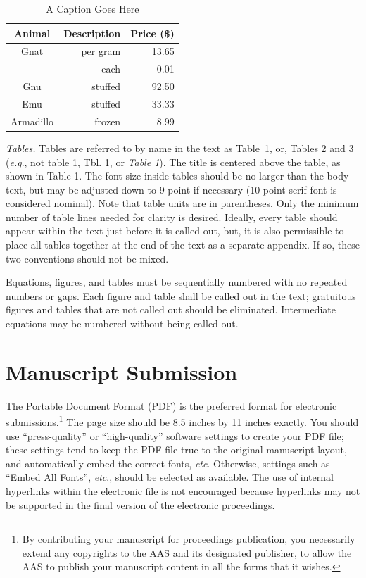 \documentclass[letterpaper, preprint, paper,11pt]{AAS}	%
\begin{document}
\begin{table}[htbp]
	\fontsize{10}{10}\selectfont
    \caption{A Caption Goes Here}
   \label{tab:label}
        \centering 
   \begin{tabular}{c | r | r } %
      \hline 
      Animal    & Description & Price (\$)\\
      \hline 
      Gnat      & per gram & 13.65 \\
                & each     &  0.01 \\
      Gnu       & stuffed  & 92.50 \\
      Emu       & stuffed  & 33.33 \\
      Armadillo & frozen   &  8.99 \\
      \hline
   \end{tabular}
\end{table}

\emph{Tables.} 
Tables are referred to by name in the text as Table~\ref{tab:label}, or, Tables 2 and 3 (\emph{e.g}., not table 1, Tbl. 1, or \emph{Table 1}). The title is centered above the table, as shown in Table 1. The font size inside tables should be no larger than the body text, but may be adjusted down to 9-point if necessary (10-point serif font is considered nominal). Note that table units are in parentheses. Only the minimum number of table lines needed for clarity is desired. Ideally, every table should appear within the text just before it is called out, but, it is also permissible to place all tables together at the end of the text as a separate appendix. If so, these two conventions should not be mixed.

Equations, figures, and tables must be sequentially numbered with no repeated numbers or gaps. Each figure and table shall be called out in the text; gratuitous figures and tables that are not called out should be eliminated. Intermediate equations may be numbered without being called out.




\section{Manuscript Submission}
The Portable Document Format (PDF) is the preferred format for electronic submissions.\footnote{By contributing your manuscript for proceedings publication, you necessarily extend any copyrights to the AAS and its designated publisher, to allow the AAS to publish your manuscript content in all the forms that it wishes.}
 The page size should be 8.5 inches by 11 inches exactly. You should use ``press-quality'' or ``high-quality'' software settings to create your PDF file; these settings tend to keep the PDF file true to the original manuscript layout, and automatically embed the correct fonts, \emph{etc}. Otherwise, settings such as ``Embed All Fonts'', \emph{etc}., should be selected as available. The use of internal hyperlinks within the electronic file is not encouraged because hyperlinks may not be supported in the final version of the electronic proceedings.
\end{document}
